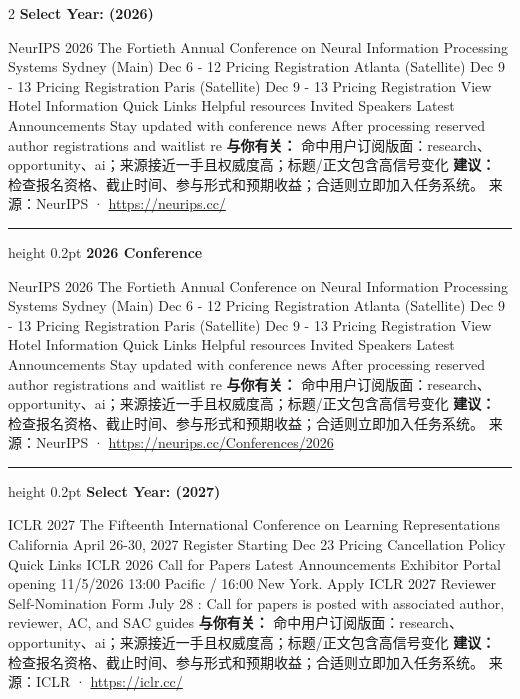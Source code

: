 \documentclass[10.5pt]{ctexart}
\begin{document}
\begin{multicols}{2}
{\large\bfseries Select Year: (2026)}\par
NeurIPS 2026 The Fortieth Annual Conference on Neural Information Processing Systems Sydney (Main) Dec 6 - 12 Pricing Registration Atlanta (Satellite) Dec 9 - 13 Pricing Registration Paris (Satellite) Dec 9 - 13 Pricing Registration View Hotel Information Quick Links Helpful resources Invited Speakers Latest Announcements Stay updated with conference news After processing reserved author registrations and waitlist re
\textbf{与你有关：} 命中用户订阅版面：research、opportunity、ai；来源接近一手且权威度高；标题/正文包含高信号变化
\textbf{建议：} 检查报名资格、截止时间、参与形式和预期收益；合适则立即加入任务系统。
{\footnotesize\color{ormuted} 来源：NeurIPS · \url{https://neurips.cc/}}
\vspace{2mm}
\hrule height 0.2pt
\vspace{2mm}
{\large\bfseries 2026 Conference}\par
NeurIPS 2026 The Fortieth Annual Conference on Neural Information Processing Systems Sydney (Main) Dec 6 - 12 Pricing Registration Atlanta (Satellite) Dec 9 - 13 Pricing Registration Paris (Satellite) Dec 9 - 13 Pricing Registration View Hotel Information Quick Links Helpful resources Invited Speakers Latest Announcements Stay updated with conference news After processing reserved author registrations and waitlist re
\textbf{与你有关：} 命中用户订阅版面：research、opportunity、ai；来源接近一手且权威度高；标题/正文包含高信号变化
\textbf{建议：} 检查报名资格、截止时间、参与形式和预期收益；合适则立即加入任务系统。
{\footnotesize\color{ormuted} 来源：NeurIPS · \url{https://neurips.cc/Conferences/2026}}
\vspace{2mm}
\hrule height 0.2pt
\vspace{2mm}
{\large\bfseries Select Year: (2027)}\par
ICLR 2027 The Fifteenth International Conference on Learning Representations California April 26-30, 2027 Register Starting Dec 23 Pricing Cancellation Policy Quick Links ICLR 2026 Call for Papers Latest Announcements Exhibitor Portal opening 11/5/2026 13:00 Pacific / 16:00 New York. Apply ICLR 2027 Reviewer Self-Nomination Form July 28 : Call for papers is posted with associated author, reviewer, AC, and SAC guides 
\textbf{与你有关：} 命中用户订阅版面：research、opportunity、ai；来源接近一手且权威度高；标题/正文包含高信号变化
\textbf{建议：} 检查报名资格、截止时间、参与形式和预期收益；合适则立即加入任务系统。
{\footnotesize\color{ormuted} 来源：ICLR · \url{https://iclr.cc/}}

\end{multicols}
\end{document}
